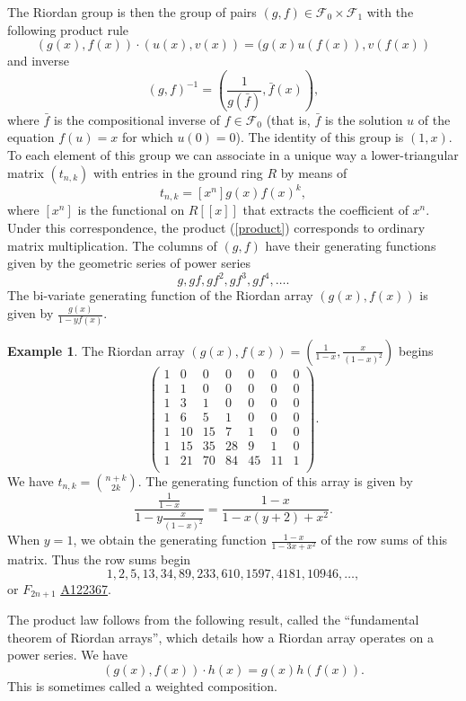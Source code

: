 \documentclass[12pt,reqno]{article}
\theoremstyle{definition}
\newtheorem{example}[theorem]{Example}
\newcommand{\seqnum}[1]{\href{http://oeis.org/#1}{\underline{#1}}}
\begin{document}
The Riordan group is then the group of pairs $(g, f) \in \mathcal{F}_0 \times \mathcal{F}_1$ with the following product rule
\begin{equation}\label{product}(g(x), f(x))\cdot (u(x), v(x))=  (g(x)u(f(x)), v(f(x))\end{equation} and inverse
$$(g, f)^{-1}= \left(\frac{1}{g(\bar{f})}, \bar{f}(x)\right),$$ where $\bar{f}$ is the compositional inverse of $f \in \mathcal{F}_0$ (that is, $\bar{f}$ is the solution $u$ of the equation $f(u)=x$ for which $u(0)=0$). The identity of this group is $(1,x)$. To each element of this group we can associate in a unique way a lower-triangular matrix $(t_{n,k})$ with entries in the ground ring $R$ by means of
$$t_{n,k}=[x^n] g(x)f(x)^k,$$ where $[x^n]$ is the functional on $R[[x]]$ that extracts the coefficient of $x^n$. Under this correspondence, the product (\ref{product}) corresponds to ordinary matrix multiplication. The columns of $(g,f)$ have their generating functions given by the geometric series of power series
$$g, gf, gf^2, gf^3, gf^4, \ldots.$$ The bi-variate generating function of the Riordan array $(g(x), f(x))$ is given by $\frac{g(x)}{1-yf(x)}$.
\begin{example} The Riordan array $(g(x),f(x))=\left(\frac{1}{1-x}, \frac{x}{(1-x)^2}\right)$ begins
$$\left(\begin{array}{ccccccc}
1 & 0 & 0 & 0 & 0 & 0 & 0 \\
1 & 1 & 0 & 0 & 0 & 0 & 0 \\
1 & 3 & 1 & 0 & 0 & 0 & 0 \\
1 & 6 & 5 & 1 & 0 & 0 & 0 \\
1 & 10 & 15 & 7 & 1 & 0 & 0 \\
1 & 15 & 35 & 28 & 9 & 1 & 0 \\
1 & 21 & 70 & 84 & 45 & 11 & 1\\
\end{array}\right).$$
We have $t_{n,k}=\binom{n+k}{2k}$.
The generating function of this array is given by
$$\frac{\frac{1}{1-x}}{1-y\frac{x}{(1-x)^2}}=\frac{1-x}{1-x(y+2)+x^2}.$$
When $y=1$, we obtain the generating function $\frac{1-x}{1-3x+x^2}$ of the row sums of this matrix. Thus the row sums begin
$$1, 2, 5, 13, 34, 89, 233, 610, 1597, 4181, 10946,\ldots,$$ or $F_{2n+1}$ \seqnum{A122367}.
\end{example}  The product law follows from the following result, called the ``fundamental theorem of Riordan arrays'', which details how a Riordan array operates on a power series. We have
$$(g(x), f(x))\cdot h(x)= g(x)h(f(x)).$$ This is sometimes called a weighted composition.
\end{document}
